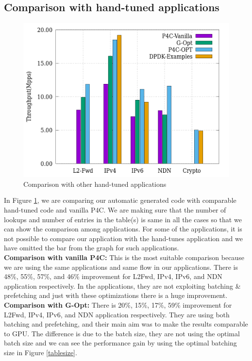 \subsection{Comparison with hand-tuned applications}
\label{comparisonexperiment}
\begin{figure}[ht]
\includegraphics[width = \linewidth]{Figures/comparison.png}
\caption{Comparison with other hand-tuned applications}
\label{comparisonfigure}
\end{figure}
In Figure \ref{comparisonfigure}, we are comparing our automatic generated code with comparable hand-tuned code and vanilla P4C\cite{Laki:2016:HSP:2934872.2959080}. We are making sure that the number of lookups and number of entries in the table(s) is same in all the cases so that we can show the comparison among applications. For some of the applications, it is not possible to compare our application with the hand-tunes application and we have omitted the bar from the graph for such applications.
\\
\textbf{Comparison with vanilla P4C\cite{Laki:2016:HSP:2934872.2959080}:} This is the most suitable comparison because we are using the same applications and same flow in our applications. There is 48\%, 55\%, 57\%, and 46\% improvement for L2Fwd, IPv4, IPv6, and NDN application respectively. In the applications, they are not exploiting batching \& prefetching and just with these optimizations there is a huge improvement.
\\
\textbf{Comparison with G-Opt\cite{189006}:} There is 20\%, 15\%, 17\%, 59\% improvement for L2Fwd, IPv4, IPv6, and NDN application respectively. They are using both batching and prefetching, and their main aim was to make the results comparable to GPU. The difference is due to the batch size, they are not using the optimal batch size and we can see the performance gain by using the optimal batching size in Figure \ref{tablesize}.
